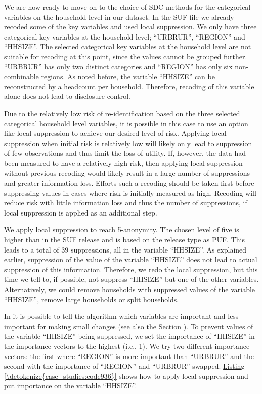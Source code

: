 \documentclass[letterpaper,10pt,english]{sphinxmanual}
\begin{document}

We are now ready to move on to the choice of SDC methods for the
categorical variables on the household level in our dataset. In the SUF
file we already recoded some of the key variables and used local
suppression. We only have three categorical key variables at the
household level; “URBRUR”, “REGION” and “HHSIZE”. The selected
categorical key variables at the household level are not suitable for
recoding at this point, since the values cannot be grouped further.
“URBRUR” has only two distinct categories and “REGION” has only six
non-combinable regions. As noted before, the variable “HHSIZE” can be
reconstructed by a headcount per household. Therefore, recoding of this
variable alone does not lead to disclosure control.

Due to the relatively low risk of re-identification based on the three
selected categorical household level variables, it is possible in this
case to use an option like local suppression to achieve our desired
level of risk. Applying local suppression when initial risk is
relatively low will likely only lead to suppression of few observations
and thus limit the loss of utility. If, however, the data had been
measured to have a relatively high risk, then applying local suppression
without previous recoding would likely result in a large number of
suppressions and greater information loss. Efforts such a recoding
should be taken first before suppressing values in cases where risk is
initially measured as high. Recoding will reduce risk with little
information loss and thus the number of suppressions, if local
suppression is applied as an additional step.

We apply local suppression to reach 5-anonymity. The chosen level of
five is higher than in the SUF release and is based on the release type
as PUF. This leads to a total of 39 suppressions, all in the variable
“HHSIZE”. As explained earlier, suppression of the value of the variable
“HHSIZE” does not lead to actual suppression of this information.
Therefore, we redo the local suppression, but this time we tell
 to, if possible, not suppress “HHSIZE” but one of the other
variables. Alternatively, we could remove households with suppressed
values of the variable “HHSIZE”, remove large households or split
households.

In  it is possible to tell the algorithm which variables are
important and less important for making small changes (see also the Section
).
To prevent values of the variable “HHSIZE” being suppressed, we
set the importance of “HHSIZE” in the importance vectors to the highest
(i.e., 1). We try two different importance vectors: the first where
“REGION” is more important than “URBRUR” and the second with the
importance of “REGION” and “URBRUR” swapped. \hyperref[\detokenize{case_studies:code936}]{Listing \ref{\detokenize{case_studies:code936}}} shows how to
apply local suppression and put importance on the variable “HHSIZE”.
\end{document}
